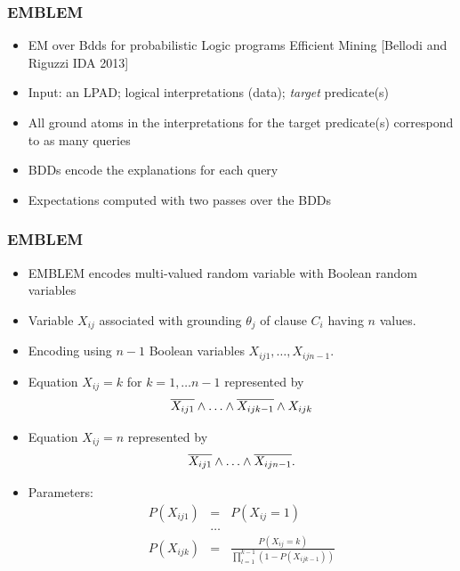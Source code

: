 \documentclass[trans,aspectratio=1610]{beamer}
\newcommand{\ranvar}[1]{%
\ensuremath{{#1}}}
\newcommand{\myalert}[1]{{%
 #1}}
\begin{document}
\begin{frame}
 \frametitle{EMBLEM}

 \begin{itemize}
	\item EM over Bdds for probabilistic Logic programs Efficient Mining [Bellodi and Riguzzi IDA 2013]
		\item Input: an LPAD; logical interpretations (data); \textit{target} predicate(s)
		\item \myalert{All ground atoms} in the interpretations for the target predicate(s) \myalert{correspond to as many queries}
		\item \myalert{BDDs} encode the explanations \myalert{for each query} 
\item Expectations computed with two passes over the BDDs
				\end{itemize}

\end{frame}

\begin{frame}
 \frametitle{EMBLEM}
  \begin{itemize}
\item EMBLEM encodes multi-valued random variable with Boolean random variables 
\item Variable $\ranvar{X}_{ij}$ associated with  grounding $\theta_j$ of clause $C_i$
having $n$ values. 
\item Encoding using $n-1$ Boolean variables 
$\ranvar{X}_{ij1},\ldots,\ranvar{X}_{ijn-1}.$
\item
 Equation $\ranvar{X}_{ij}=k$ for $k=1,\ldots n-1$ represented by
  $$\overline{\ranvar{X}_{ij1}}\wedge\ldots \wedge \overline{\ranvar{X}_{ijk-1}}\wedge \ranvar{X}_{ijk}$$
  \item Equation $\ranvar{X}_{ij}=n$ represented by 
  $$\overline{\ranvar{X}_{ij1}}\wedge\ldots \wedge\overline{\ranvar{X}_{ijn-1}}.$$
\item Parameters:
\begin{eqnarray*}
P(\ranvar{X}_{ij1})&=&P(\ranvar{X}_{ij}=1)\\
&\ldots&\\
 P(\ranvar{X}_{ijk})&=&\frac{P(\ranvar{X}_{ij}=k)}{\prod_{l=1}^{k-1}(1-P(\ranvar{X}_{ijk-1}))}
 \end{eqnarray*}
 \end{itemize}
\end{frame}
\end{document}
